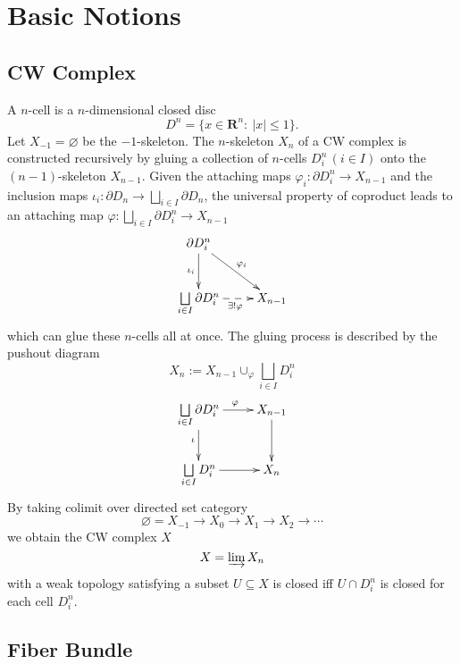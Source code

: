 \documentclass{report}
\begin{document}
\chapter{Basic Notions}
\section{CW Complex}
A $n$-cell is a $n$-dimensional closed disc
\[
	D^n=\{x\in\mathbf{R}^n:\ |x|\le 1\}.
\]
Let $X_{-1}=\varnothing$ be the $-1$-skeleton. The $n$-skeleton $X_n$ of a CW complex is constructed recursively by gluing a collection of $n$-cells $D^n_i\,(i\in I)$ onto the $(n-1)$-skeleton $X_{n-1}$. Given the attaching maps $\varphi_i:\partial D^n_i\to X_{n-1}$ and the inclusion maps $\iota_i:\partial D_n\to \bigsqcup\limits_{i\in I}\partial D_n$, the universal property of coproduct leads to an attaching map $\varphi:\bigsqcup\limits_{i\in I}\partial D^n_i\to X_{n-1}$  
\[\xymatrix{
	\partial D^n_i\ar[rd]^{\varphi_i}\ar[d]_{\iota_i}&\\
	\bigsqcup\limits_{i\in I}\partial D^n_i\ar@{-->}[r]_{\exists!\varphi} &X_{n-1}
		}\]
which can glue these $n$-cells all at once. The gluing process is described by the pushout diagram
\[
	X_{n}:=X_{n-1}\cup_{\varphi}\bigsqcup\limits_{i\in I} D^n_i
\]
\[\xymatrix{
	\bigsqcup\limits_{i\in I}\partial D^n_i\ar[r]^{\varphi}\ar[d]_{\iota}  &X_{n-1}\ar[d]_{}\\
	\bigsqcup\limits_{i\in I} D^n_i\ar@{->}[r]_{}&X_{n}
		}\]
By taking colimit over directed set category
$$
\varnothing=X_{-1} \rightarrow X_0 \rightarrow X_1 \rightarrow X_2 \rightarrow \cdots
$$
we obtain the CW complex $X$
\[
	X=\varinjlim X_n
\]
with a weak topology satisfying a subset $U \subseteq X$ is closed iff $U \cap D^n_i$ is closed for each cell $D^n_i$.

\section{Fiber Bundle}
\end{document}
